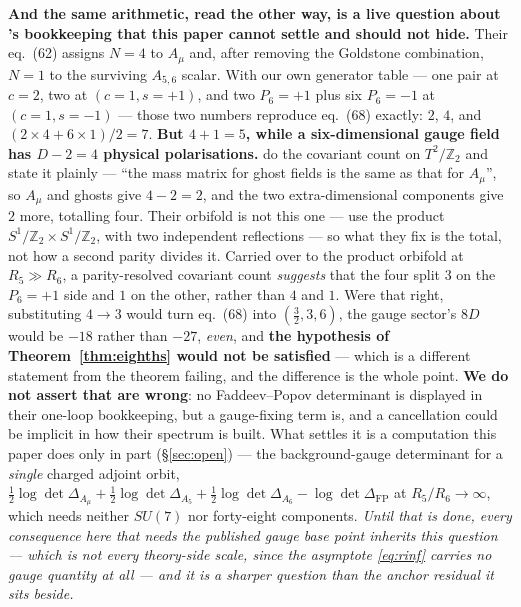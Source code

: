 \documentclass[11pt,a4paper]{article}
\newcommand{\ZZ}{\mathbb{Z}}
\newcommand{\su}[1]{SU(#1)}
\begin{document}
\noindent \textbf{And the same arithmetic, read the other way, is a live question about
\cite{KM25}'s bookkeeping that this paper cannot settle and should not hide.} Their eq.~(62)
assigns $N=4$ to $A_\mu$ and, after removing the Goldstone combination, $N=1$ to the surviving
$A_{5,6}$ scalar. With our own generator table --- one pair at $c=2$, two at $(c{=}1,s{=}{+}1)$,
and two $P_6{=}{+}1$ plus six $P_6{=}{-}1$ at $(c{=}1,s{=}{-}1)$ --- those two numbers reproduce
eq.~(68) exactly: $2$, $4$, and $(2\times4+6\times1)/2=7$. \textbf{But $4+1=5$, while a
six-dimensional gauge field has $D-2=4$ physical polarisations.} \cite{HNT} do the covariant count
on $T^2/\ZZ_2$ and state it plainly --- ``the mass matrix for ghost fields is the same as that for
$A_\mu$'', so $A_\mu$ and ghosts give $4-2=2$, and the two extra-dimensional components give $2$
more, totalling four. Their orbifold is not this one --- \cite{KM25} use the product
$S^1/\ZZ_2\times S^1/\ZZ_2$, with two independent reflections --- so what they fix is the total,
not how a second parity divides it. Carried over to the product orbifold at $R_5\gg R_6$, a
parity-resolved covariant count \emph{suggests} that the four split $3$ on the $P_6{=}{+}1$ side
and $1$ on the other, rather than $4$ and $1$. Were that right, substituting $4\to3$ would turn
eq.~(68) into $(\tfrac32,3,6)$, the gauge sector's $8D$ would be $-18$ rather than $-27$,
\emph{even}, and \textbf{the hypothesis of Theorem~\ref{thm:eighths} would not be satisfied} ---
which is a different statement from the theorem failing, and the difference is the whole point. \textbf{We do not assert that \cite{KM25} are wrong}: no
Faddeev--Popov determinant is displayed in their one-loop bookkeeping, but a gauge-fixing term is,
and a cancellation could be implicit in how their spectrum is built. What settles it is a
computation this paper does only in part (\S\ref{sec:open}) --- the background-gauge determinant for a \emph{single} charged
adjoint orbit, $\tfrac12\log\det\Delta_{A_\mu}+\tfrac12\log\det\Delta_{A_5}
+\tfrac12\log\det\Delta_{A_6}-\log\det\Delta_{\mathrm{FP}}$ at $R_5/R_6\to\infty$, which needs
neither $\su7$ nor forty-eight components. \emph{Until that is done, every consequence here that needs the published gauge base point inherits
this question --- which is not every theory-side scale, since the asymptote \eqref{eq:rinf} carries
no gauge quantity at all --- and it is a sharper question than the anchor residual it sits beside.}
\end{document}
